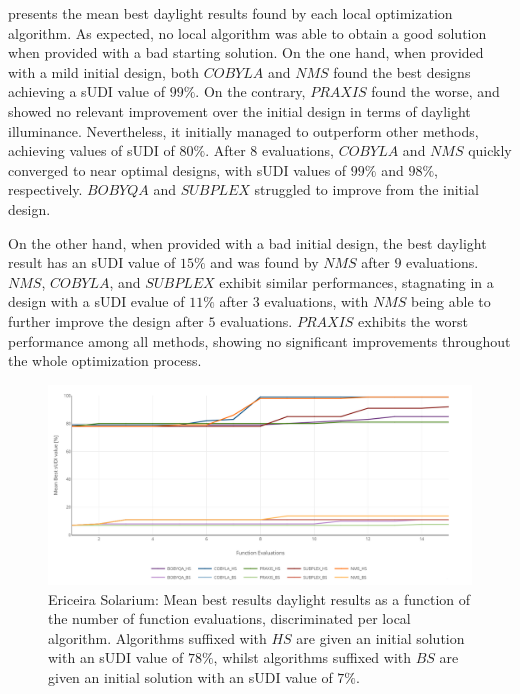  presents the mean best daylight results found by each local optimization algorithm. As expected, no local algorithm was able to obtain a good solution when provided with a bad starting solution. On the one hand, when provided with a mild initial design, both $COBYLA$ and $NMS$ found the best designs achieving a \ac{sUDI} value of $99\%$. On the contrary, $PRAXIS$ found the worse, and showed no relevant improvement over the initial design in terms of daylight illuminance. Nevertheless, it initially managed to outperform other methods, achieving values of \ac{sUDI} of $80\%$. After $8$ evaluations, $COBYLA$ and $NMS$ quickly converged to near optimal designs, with \ac{sUDI} values of $99\%$ and $98\%$, respectively. $BOBYQA$ and $SUBPLEX$ struggled to improve from the initial design.

On the other hand, when provided with a bad initial design, the best daylight result has an \ac{sUDI} value of $15\%$ and was found by $NMS$ after $9$ evaluations. $NMS$, $COBYLA$, and $SUBPLEX$ exhibit similar performances, stagnating in a design with a \ac{sUDI} evalue of $11\%$ after $3$ evaluations, with $NMS$ being able to further improve the design after $5$ evaluations. $PRAXIS$ exhibits the worst performance among all methods, showing no significant improvements throughout the whole optimization process.

\begin{figure}[htbp]
	\centering
	\includegraphics[width=\textwidth]{Images/Evaluation/Ericeira_results_ph2.PNG}
	\caption[Ericeira Solarium: Mean best results of daylight performance in function of the number of evaluations, discriminated per local algorithm]{Ericeira Solarium: Mean best results daylight results as a function of the number of function evaluations, discriminated per local algorithm. Algorithms suffixed with $HS$ are given an initial solution with an \ac{sUDI} value of $78\%$, whilst algorithms suffixed with $BS$ are given an initial solution with an \ac{sUDI} value of $7\%$.}
	\label{fig:phase2results}
\end{figure}


